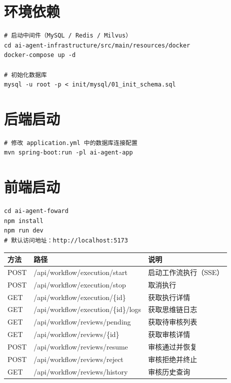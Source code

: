 

\section*{环境依赖}

\begin{lstlisting}[style=bash, caption={环境依赖启动命令}]
# 启动中间件（MySQL / Redis / Milvus）
cd ai-agent-infrastructure/src/main/resources/docker
docker-compose up -d

# 初始化数据库
mysql -u root -p < init/mysql/01_init_schema.sql
\end{lstlisting}

\section*{后端启动}

\begin{lstlisting}[style=bash, caption={后端启动命令}]
# 修改 application.yml 中的数据库连接配置
mvn spring-boot:run -pl ai-agent-app
\end{lstlisting}

\section*{前端启动}

\begin{lstlisting}[style=bash, caption={前端启动命令}]
cd ai-agent-foward
npm install
npm run dev
# 默认访问地址：http://localhost:5173
\end{lstlisting}


\begin{longtable}{lll}
  \toprule
  方法 & 路径 & 说明 \\
  \midrule
  \endfirsthead
  POST & /api/workflow/execution/start & 启动工作流执行（SSE） \\
  POST & /api/workflow/execution/stop & 取消执行 \\
  GET  & /api/workflow/execution/\{id\} & 获取执行详情 \\
  GET  & /api/workflow/execution/\{id\}/logs & 获取思维链日志 \\
  GET  & /api/workflow/reviews/pending & 获取待审核列表 \\
  GET  & /api/workflow/reviews/\{id\} & 获取审核详情 \\
  POST & /api/workflow/reviews/resume & 审核通过并恢复 \\
  POST & /api/workflow/reviews/reject & 审核拒绝并终止 \\
  GET  & /api/workflow/reviews/history & 审核历史查询 \\
  \bottomrule
\end{longtable}
